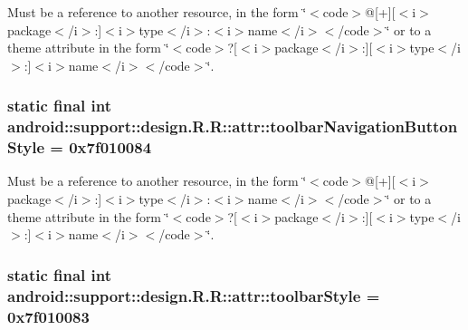 Must be a reference to another resource, in the form \char`\"{}$<$code$>$@\mbox{[}+\mbox{]}\mbox{[}$<$i$>$package$<$/i$>$:\mbox{]}$<$i$>$type$<$/i$>$:$<$i$>$name$<$/i$>$$<$/code$>$\char`\"{} or to a theme attribute in the form \char`\"{}$<$code$>$?\mbox{[}$<$i$>$package$<$/i$>$:\mbox{]}\mbox{[}$<$i$>$type$<$/i$>$:\mbox{]}$<$i$>$name$<$/i$>$$<$/code$>$\char`\"{}. \hypertarget{classandroid_1_1support_1_1design_1_1_r_1_1attr_81bbc5cc398b8da285560b86cecb66b6}{
\subsubsection[{toolbarNavigationButtonStyle}]{\setlength{\rightskip}{0pt plus 5cm}static final int android::support::design.R.R::attr::toolbarNavigationButtonStyle = 0x7f010084}}
\label{classandroid_1_1support_1_1design_1_1_r_1_1attr_81bbc5cc398b8da285560b86cecb66b6}


Must be a reference to another resource, in the form \char`\"{}$<$code$>$@\mbox{[}+\mbox{]}\mbox{[}$<$i$>$package$<$/i$>$:\mbox{]}$<$i$>$type$<$/i$>$:$<$i$>$name$<$/i$>$$<$/code$>$\char`\"{} or to a theme attribute in the form \char`\"{}$<$code$>$?\mbox{[}$<$i$>$package$<$/i$>$:\mbox{]}\mbox{[}$<$i$>$type$<$/i$>$:\mbox{]}$<$i$>$name$<$/i$>$$<$/code$>$\char`\"{}. \hypertarget{classandroid_1_1support_1_1design_1_1_r_1_1attr_4d32704faa4804f94c482d1afbeab27b}{
\subsubsection[{toolbarStyle}]{\setlength{\rightskip}{0pt plus 5cm}static final int android::support::design.R.R::attr::toolbarStyle = 0x7f010083}}
\label{classandroid_1_1support_1_1design_1_1_r_1_1attr_4d32704faa4804f94c482d1afbeab27b}


